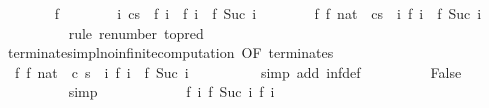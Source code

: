 \begin{isabellebody}
\ \ \ \ \ \ \isamarkupfalse%
\ f\isanewline
\ \ \ \ \ \ \isamarkupfalse%
\ {\isachardoublequoteopen}{\isasymforall}i{\isachardot}\ {\isasymGamma}{\isasymturnstile}{\isacharparenleft}c{\isacharcomma}s{\isacharparenright}\ {\isasymrightarrow}\isactrlsup {\isacharasterisk}\ f\ i\ {\isasymand}\ {\isasymGamma}{\isasymturnstile}f\ i\ {\isasymrightarrow}\ f\ {\isacharparenleft}Suc\ i{\isacharparenright}{\isachardoublequoteclose}\isanewline
\ \ \ \ \ \ \isamarkupfalse%
\ {\isachardoublequoteopen}{\isasymexists}f{\isachardot}\ f\ {\isacharparenleft}{}{\isacharcolon}{\isacharcolon}nat{\isacharparenright}\ {\isacharequal}\ {\isacharparenleft}c{\isacharcomma}s{\isacharparenright}\ {\isasymand}\ {\isacharparenleft}{\isasymforall}i{\isachardot}\ {\isasymGamma}{\isasymturnstile}f\ i\ {\isasymrightarrow}\ f\ {\isacharparenleft}Suc\ i{\isacharparenright}{\isacharparenright}{\isachardoublequoteclose}\isanewline
\ \ \ \ \ \ \ \ \isamarkupfalse%
\ {\isacharparenleft}rule\ renumber\ {\isacharbrackleft}to{\isacharunderscore}pred{\isacharbrackright}{\isacharparenright}\isanewline
\ \ \ \ \ \ \isamarkupfalse%
\ \isamarkupfalse%
\ terminates{\isacharunderscore}impl{\isacharunderscore}no{\isacharunderscore}infinite{\isacharunderscore}computation\ {\isacharbrackleft}OF\ terminates{\isacharbrackright}\isanewline
\ \ \ \ \ \ \isamarkupfalse%
\ {\isachardoublequoteopen}{\isasymnot}\ {\isacharparenleft}{\isasymexists}f{\isachardot}\ f\ {\isacharparenleft}{}{\isacharcolon}{\isacharcolon}nat{\isacharparenright}\ {\isacharequal}\ {\isacharparenleft}c{\isacharcomma}\ s{\isacharparenright}\ {\isasymand}\ {\isacharparenleft}{\isasymforall}i{\isachardot}\ {\isasymGamma}{\isasymturnstile}f\ i\ {\isasymrightarrow}\ f\ {\isacharparenleft}Suc\ i{\isacharparenright}{\isacharparenright}{\isacharparenright}{\isachardoublequoteclose}\isanewline
\ \ \ \ \ \ \ \ \isamarkupfalse%
\ {\isacharparenleft}simp\ add{\isacharcolon}\ inf{\isacharunderscore}def{\isacharparenright}\isanewline
\ \ \ \ \ \ \isamarkupfalse%
\ \isamarkupfalse%
\ False\isanewline
\ \ \ \ \ \ \ \ \isamarkupfalse%
\ simp\isanewline
\ \ \ \ \isamarkupfalse%
\isanewline
\ \ \isamarkupfalse%
\isanewline
\ \ \isamarkupfalse%
\ {\isachardoublequoteopen}{\isasymnot}\ {\isacharparenleft}{\isasymexists}f{\isachardot}\ {\isasymforall}i{\isachardot}\ {\isacharparenleft}f\ {\isacharparenleft}Suc\ i{\isacharparenright}{\isacharcomma}\ f\ i{\isacharparenright}\isanewline

\end{isabellebody}

